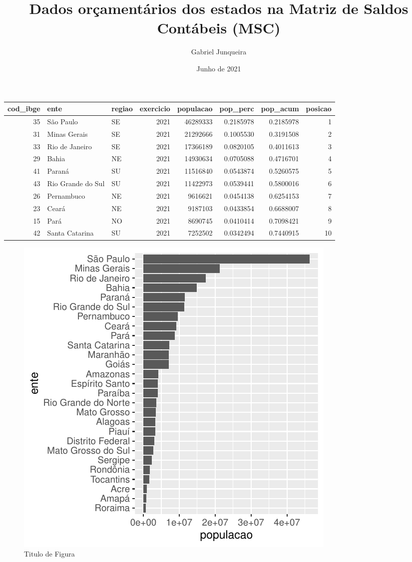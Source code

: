 \documentclass{article}\usepackage[]{graphicx}\usepackage[]{color}
\title{Dados orçamentários dos estados na Matriz de Saldos Contábeis (MSC)}
\author{Gabriel Junqueira}
\date{Junho de 2021}
\makeatletter
\def\maxwidth{ %
  \ifdim\Gin@nat@width>\linewidth
    \linewidth
  \else
    \Gin@nat@width
  \fi
}
\newenvironment{knitrout}{}{} %
\makeatother
\begin{document}
\maketitle

\textbf{}





\begin{tabular}{r|l|l|r|r|r|r|r}
\hline
cod\_ibge & ente & regiao & exercicio & populacao & pop\_perc & pop\_acum & posicao\\
\hline
35 & São Paulo & SE & 2021 & 46289333 & 0.2185978 & 0.2185978 & 1\\
\hline
31 & Minas Gerais & SE & 2021 & 21292666 & 0.1005530 & 0.3191508 & 2\\
\hline
33 & Rio de Janeiro & SE & 2021 & 17366189 & 0.0820105 & 0.4011613 & 3\\
\hline
29 & Bahia & NE & 2021 & 14930634 & 0.0705088 & 0.4716701 & 4\\
\hline
41 & Paraná & SU & 2021 & 11516840 & 0.0543874 & 0.5260575 & 5\\
\hline
43 & Rio Grande do Sul & SU & 2021 & 11422973 & 0.0539441 & 0.5800016 & 6\\
\hline
26 & Pernambuco & NE & 2021 & 9616621 & 0.0454138 & 0.6254153 & 7\\
\hline
23 & Ceará & NE & 2021 & 9187103 & 0.0433854 & 0.6688007 & 8\\
\hline
15 & Pará & NO & 2021 & 8690745 & 0.0410414 & 0.7098421 & 9\\
\hline
42 & Santa Catarina & SU & 2021 & 7252502 & 0.0342494 & 0.7440915 & 10\\
\hline
\end{tabular}



\begin{knitrout}
\color{fgcolor}\begin{figure}
\includegraphics[width=\maxwidth]{figure/unnamed-chunk-3-1} \caption[Titulo de Figura]{Titulo de Figura}\label{fig:unnamed-chunk-3}
\end{figure}

\end{knitrout}
\end{document}
